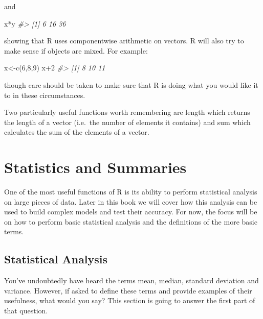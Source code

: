 \documentclass[
]{book}
\newenvironment{Shaded}{\begin{snugshade}}{\end{snugshade}}
\newcommand{\CommentTok}[1]{\textcolor[rgb]{0.56,0.35,0.01}{\textit{#1}}}
\newcommand{\DecValTok}[1]{\textcolor[rgb]{0.00,0.00,0.81}{#1}}
\newcommand{\FunctionTok}[1]{\textcolor[rgb]{0.00,0.00,0.00}{#1}}
\newcommand{\NormalTok}[1]{#1}
\newcommand{\OtherTok}[1]{\textcolor[rgb]{0.56,0.35,0.01}{#1}}
\newcommand{\SpecialCharTok}[1]{\textcolor[rgb]{0.00,0.00,0.00}{#1}}
\begin{document}
and

\begin{Shaded}
\begin{Highlighting}[]
\NormalTok{x}\SpecialCharTok{*}\NormalTok{y}
\CommentTok{\#\textgreater{} [1]  6 16 36}
\end{Highlighting}
\end{Shaded}

showing that R uses componentwise arithmetic on vectors. R will also try to make sense if objects
are mixed. For example:

\begin{Shaded}
\begin{Highlighting}[]
\NormalTok{x}\OtherTok{\textless{}{-}}\FunctionTok{c}\NormalTok{(}\DecValTok{6}\NormalTok{,}\DecValTok{8}\NormalTok{,}\DecValTok{9}\NormalTok{)}
\NormalTok{x}\SpecialCharTok{+}\DecValTok{2}
\CommentTok{\#\textgreater{} [1]  8 10 11}
\end{Highlighting}
\end{Shaded}

though care should be taken to make sure that R is doing what you would like it to in these circumstances.

Two particularly useful functions worth remembering are length which returns the length of a vector (i.e.~the number of elements it contains) and sum which calculates the sum of the elements of a vector.

\hypertarget{statistics-and-summaries}{%
\section{Statistics and Summaries}\label{statistics-and-summaries}}

One of the most useful functions of R is its ability to perform statistical analysis on large pieces of data. Later in this book we will cover how this analysis can be used to build complex models and test their accuracy. For now, the focus will be on how to perform basic statistical analysis and the definitions of the more basic terms.

\hypertarget{statistical-analysis}{%
\subsection{Statistical Analysis}\label{statistical-analysis}}

You've undoubtedly have heard the terms mean, median, standard deviation and variance. However, if asked to define these terms and provide examples of their usefulness, what would you say? This section is going to answer the first part of that question.
\end{document}
